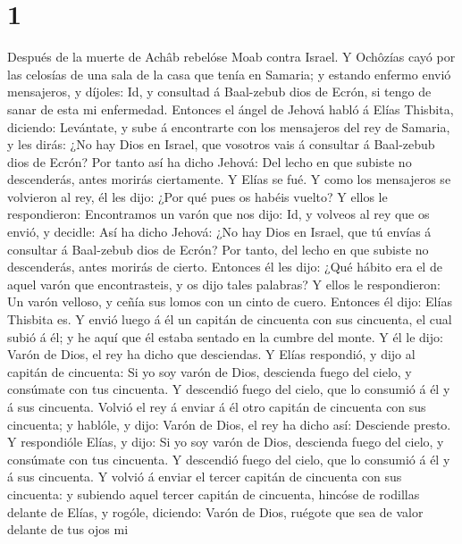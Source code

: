 \hypertarget{section}{%
\section{1}\label{section}}

 Después de la muerte de Achâb rebelóse Moab contra
Israel.  Y Ochôzías cayó por las celosías de una sala de
la casa que tenía en Samaria; y estando enfermo envió mensajeros, y
díjoles: Id, y consultad á Baal-zebub dios de Ecrón, si tengo de sanar
de esta mi enfermedad.  Entonces el ángel de Jehová habló
á Elías Thisbita, diciendo: Levántate, y sube á encontrarte con los
mensajeros del rey de Samaria, y les dirás: ¿No hay Dios en Israel, que
vosotros vais á consultar á Baal-zebub dios de Ecrón?  Por
tanto así ha dicho Jehová: Del lecho en que subiste no descenderás,
antes morirás ciertamente. Y Elías se fué.  Y como los
mensajeros se volvieron al rey, él les dijo: ¿Por qué pues os habéis
vuelto?  Y ellos le respondieron: Encontramos un varón que
nos dijo: Id, y volveos al rey que os envió, y decidle: Así ha dicho
Jehová: ¿No hay Dios en Israel, que tú envías á consultar á Baal-zebub
dios de Ecrón? Por tanto, del lecho en que subiste no descenderás, antes
morirás de cierto.  Entonces él les dijo: ¿Qué hábito era
el de aquel varón que encontrasteis, y os dijo tales palabras?
 Y ellos le respondieron: Un varón velloso, y ceñía sus
lomos con un cinto de cuero. Entonces él dijo: Elías Thisbita es.
 Y envió luego á él un capitán de cincuenta con sus
cincuenta, el cual subió á él; y he aquí que él estaba sentado en la
cumbre del monte. Y él le dijo: Varón de Dios, el rey ha dicho que
desciendas.  Y Elías respondió, y dijo al capitán de
cincuenta: Si yo soy varón de Dios, descienda fuego del cielo, y
consúmate con tus cincuenta. Y descendió fuego del cielo, que lo
consumió á él y á sus cincuenta.  Volvió el rey á enviar
á él otro capitán de cincuenta con sus cincuenta; y hablóle, y dijo:
Varón de Dios, el rey ha dicho así: Desciende presto.  Y
respondióle Elías, y dijo: Si yo soy varón de Dios, descienda fuego del
cielo, y consúmate con tus cincuenta. Y descendió fuego del cielo, que
lo consumió á él y á sus cincuenta.  Y volvió á enviar el
tercer capitán de cincuenta con sus cincuenta: y subiendo aquel tercer
capitán de cincuenta, hincóse de rodillas delante de Elías, y rogóle,
diciendo: Varón de Dios, ruégote que sea de valor delante de tus ojos mi
